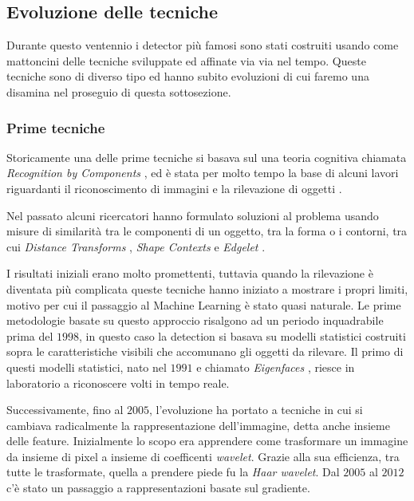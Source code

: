 \subsection{Evoluzione delle tecniche}
Durante questo ventennio i detector più famosi sono stati costruiti usando come mattoncini delle tecniche sviluppate ed affinate via via nel tempo. Queste tecniche sono di diverso tipo ed hanno subito evoluzioni di cui faremo una disamina nel proseguio di questa sottosezione.
\subsubsection{Prime tecniche}
Storicamente una delle prime tecniche si basava sul una teoria cognitiva chiamata \textit{Recognition by Components} \cite{biederman1987recognition}, ed è stata per molto tempo la base di alcuni lavori riguardanti il riconoscimento di immagini e la rilevazione di oggetti \cite{felzenszwalb2008discriminatively, fischler1973representation, leibe2008robust}.   

Nel passato alcuni ricercatori hanno formulato soluzioni al problema usando misure di similarità tra le componenti di un oggetto, tra la forma o i contorni, tra cui \textit{Distance Transforms} \cite{gavrila1999real}, \textit{Shape Contexts} \cite{belongie2002shape} e \textit{Edgelet} \cite{wu2005detection}.

I risultati iniziali erano molto promettenti, tuttavia quando la rilevazione è diventata più complicata queste tecniche hanno iniziato a mostrare i propri limiti, motivo per cui il passaggio al Machine Learning è stato quasi naturale. Le prime metodologie basate su questo approccio risalgono ad un periodo inquadrabile prima del $1998$, in questo caso la detection si basava su modelli statistici costruiti sopra le caratteristiche visibili che accomunano gli oggetti da rilevare. 
Il primo di questi modelli statistici, nato nel $1991$ e chiamato \textit{Eigenfaces} \cite{turk1991eigenfaces, pentland1994view}, riesce in laboratorio a riconoscere volti in tempo reale.

Successivamente, fino al $2005$, l'evoluzione ha portato a tecniche in cui si cambiava radicalmente la rappresentazione dell'immagine, detta anche insieme delle feature. Inizialmente lo scopo era apprendere come trasformare un immagine da insieme di pixel a insieme di coefficenti \textit{wavelet}. Grazie alla sua efficienza, tra tutte le trasformate, quella a prendere piede fu la \textit{Haar wavelet}. Dal $2005$ al $2012$ c'è stato un passaggio a rappresentazioni basate sul gradiente. 

